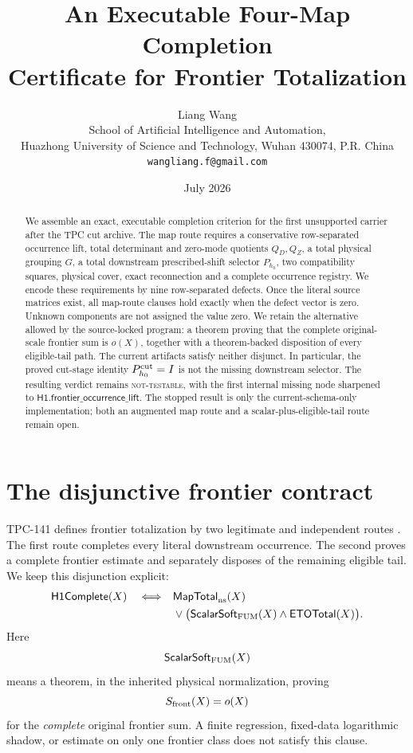 \documentclass[11pt]{article}
\title{\textbf{An Executable Four-Map Completion}\\
\textbf{Certificate for Frontier Totalization}}
\author{Liang Wang\\
School of Artificial Intelligence and Automation,\\
Huazhong University of Science and Technology, Wuhan 430074, P.R. China\\
\texttt{wangliang.f@gmail.com}}
\date{July 2026}
\theoremstyle{definition}
\theoremstyle{remark}
\begin{document}
\maketitle

\begin{abstract}
We assemble an exact, executable completion criterion for the first
unsupported carrier after the TPC cut archive.  The map route requires
a conservative row-separated occurrence lift, total determinant and
zero-mode quotients \(Q_D,Q_Z\), a total physical grouping \(G\), a
total downstream prescribed-shift selector \(P_{h_0}\), two
compatibility squares, physical cover, exact reconnection and a
complete occurrence registry.  We encode these requirements by nine
row-separated defects.  Once the literal source matrices exist, all
map-route clauses hold exactly when the defect vector is zero.
Unknown components are not assigned the value zero.  We retain the
alternative allowed by the source-locked program: a theorem proving
that the complete original-scale frontier sum is \(o(X)\), together
with a theorem-backed disposition of every eligible-tail path.  The
current artifacts satisfy neither disjunct.  In particular, the
proved cut-stage identity \(P_{h_0}^{\rm cut}=I\) is not the missing
downstream selector.  The resulting verdict remains
\textsc{not-testable}, with the first internal missing node sharpened
to \(\mathsf{H1.frontier\_occurrence\_lift}\).  The stopped result is
only the current-schema-only implementation; both an augmented map
route and a scalar-plus-eligible-tail route remain open.
\end{abstract}

\section{The disjunctive frontier contract}

TPC-141 defines frontier totalization by two legitimate and
independent routes \citep{WangTPC141}.  The first route completes
every literal downstream occurrence.  The second proves a complete
frontier estimate and separately disposes of the remaining eligible
tail.  We keep this disjunction explicit:
\begin{equation}
\begin{split}
\mathsf{H1Complete}(X)
\quad\Longleftrightarrow\quad&
\mathsf{MapTotal}_{\rm ns}(X)\\
&{}\lor\bigl(
\mathsf{ScalarSoft}_{\rm FUM}(X)
\land\mathsf{ETOTotal}(X)\bigr).
\end{split}
\label{eq:disjunction}
\end{equation}
Here
\[
\mathsf{ScalarSoft}_{\rm FUM}(X)
\]
means a theorem, in the inherited physical normalization, proving
\[
 S_{\rm front}(X)=o(X)
\]
for the \emph{complete} original frontier sum.  A finite regression,
fixed-data logarithmic shadow, or estimate on only one frontier class
does not satisfy this clause.
\end{document}

